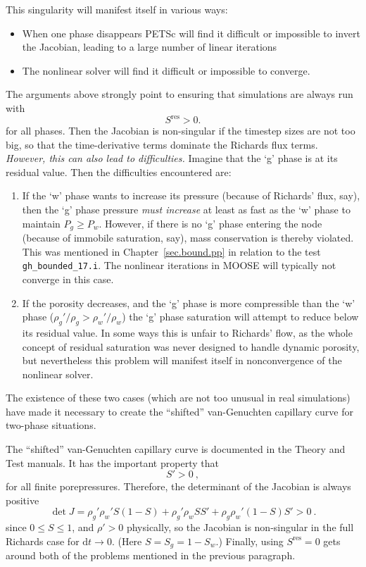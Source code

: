 \documentclass[]{scrreprt}
\begin{document}
This singularity will manifest itself in various ways:
\begin{itemize}
\item When one phase disappears PETSc will find it difficult or
  impossible to invert the Jacobian, leading to a large number of
  linear iterations
\item The nonlinear solver will find it difficult or impossible to
  converge.
\end{itemize}

\noindent The arguments above strongly point to ensuring that simulations are
always run with
\begin{equation}
S^{\mathrm{res}}>0.
\end{equation}
for all phases.  Then the Jacobian is non-singular if the timestep
sizes are not too big, so that the time-derivative terms dominate the
Richards flux terms.  {\em However, this can also lead to
  difficulties.}  Imagine that the `g' phase is at its residual
value.  Then the difficulties encountered are:
\begin{enumerate}
\item If the `w' phase wants to increase its pressure (because of
  Richards' flux, say), then the `g' phase pressure {\em must
    increase} at least as fast as the `w' phase to maintain $P_{g}\geq
  P_{w}$.  However, if there is no `g' phase entering the node
  (because of immobile saturation, say), mass conservation is thereby
  violated.  This was mentioned in Chapter~\ref{sec.bound.pp} in
  relation to the test {\tt gh\_bounded\_17.i}.  The nonlinear
  iterations in MOOSE will typically not converge in this case.
\item If the porosity decreases, and the `g' phase is more
  compressible than the `w' phase ($\rho_{g}'/\rho_{g} >
  \rho_{w}'/\rho_{w}$) the `g' phase saturation will attempt to reduce
  below its residual value.  In some ways this is unfair to Richards'
  flow, as the whole concept of residual saturation was never designed
  to handle dynamic porosity, but nevertheless this problem will
  manifest itself in nonconvergence of the nonlinear solver.
\end{enumerate}
The existence of these two cases (which are not too unusual in real
simulations) have made it necessary to create the ``shifted''
van-Genuchten capillary curve for two-phase situations.

The ``shifted'' van-Genuchten capillary curve is documented in the
Theory and Test manuals.  It has the important property that
\begin{equation}
S' > 0 \ ,
\end{equation}
for all finite porepressures.  Therefore, the determinant of the
Jacobian is always positive
\begin{equation}
\det J = \rho_{g}'\rho_{w}'S(1-S) + \rho_{g}'\rho_{w}SS' +
\rho_{g}\rho_{w}'(1-S)S' > 0 \ .
\end{equation}
since $0\leq S\leq 1$, and $\rho'>0$ physically, so the Jacobian is
non-singular in the full Richards case for $\mathrm{d}t \rightarrow 0$.  (Here
$S = S_{g} = 1-S_{w}$.)   Finally, using $S^{\mathrm{res}}=0$ gets
around both of the problems mentioned in the previous paragraph.
\end{document}
